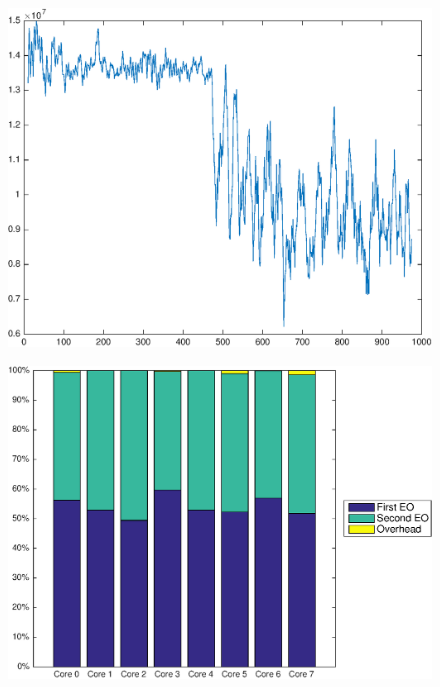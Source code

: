 \documentclass[a4paper,10pt]{article}
\begin{document}
\begin{figure}
    \centering
    \begin{minipage}{0.45\textwidth}
        \centering
        \includegraphics[width=0.99\linewidth]{exp2_cyc.eps}
        \label{fig:cyc_exp2}
    \end{minipage}
    \hfill
    \begin{minipage}{0.45\textwidth}
        \centering
        \includegraphics[width=0.99\linewidth]{exp2_eo.eps}
        \label{fig:eo_exp2}
    \end{minipage}%
\end{figure}


\end{document}
